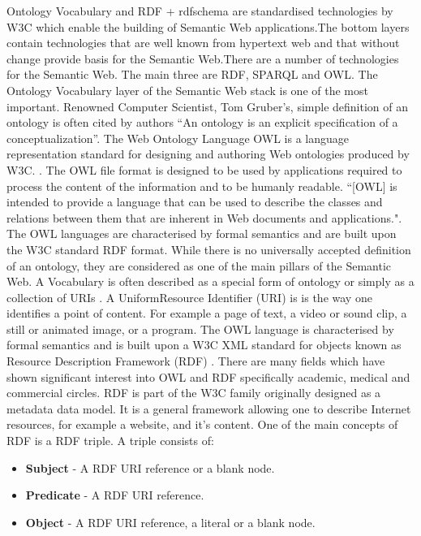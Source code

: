 Ontology Vocabulary and RDF + rdfschema are standardised technologies by W3C which enable the building of Semantic Web applications.The bottom layers contain technologies that are well known from hypertext web and that without change provide basis for the Semantic Web.There are a number of technologies for the Semantic Web. The main three are RDF, SPARQL and OWL. The Ontology Vocabulary layer of the Semantic Web stack is one of the most important. Renowned Computer Scientist, Tom Gruber's, simple definition of an ontology is often cited by authors ``An ontology is an explicit specification of a conceptualization''. The Web Ontology Language OWL is a language representation standard for designing and authoring Web ontologies produced by W3C. \cite{owl}. The OWL file format is designed to be used by applications required to process the content of the information and to be humanly readable. ``[OWL] is intended to provide a language that can be used to describe the classes and relations between them that are inherent in Web documents and applications."\cite{owl}. The OWL languages are characterised by formal semantics and are built upon the W3C standard RDF format. While there is no universally accepted definition of an ontology, they are considered as one of the main pillars of the Semantic Web. A Vocabulary is often described as a special form of ontology or simply as a collection of URIs \cite{11}. A UniformResource Identifier (URI) is is the way one identifies a point of content. For example a page of text, a video or sound clip, a still or animated image, or a program. The OWL language is characterised by formal semantics and is built upon a W3C XML standard for objects known as Resource Description Framework (RDF) \cite{15}. There are many fields which have shown significant interest into OWL and RDF specifically academic, medical and commercial circles. RDF is part of the W3C family originally designed as a metadata data model. It is a general framework allowing one to describe Internet resources, for example a website, and it's content. One of the main concepts of RDF is a RDF triple. A triple consists of:

\begin{itemize}
\item \textbf{Subject} - A RDF URI reference or a blank node.
\item \textbf{Predicate} - A RDF URI reference.
\item \textbf{Object} - A RDF URI reference, a literal or a blank node.
\end{itemize}

